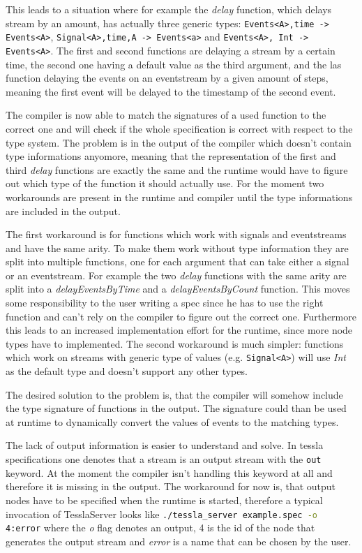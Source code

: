 This leads to a situation where for example the \emph{delay} function, which delays stream by an amount, has actually three generic types: \lstinline{Events<A>,time -> Events<A>}, \lstinline{Signal<A>,time,A -> Events<a>} and \lstinline{Events<A>, Int -> Events<A>}.
The first and second functions are delaying a stream by a certain time, the second one having a default value as the third argument, and the las function delaying the events on an eventstream by a given amount of steps, meaning the first event will be delayed to the timestamp of the second event.

The compiler is now able to match the signatures of a used function to the correct one and will check if the whole specification is correct with respect to the type system.
The problem is in the output of the compiler which doesn't contain type informations anyomore, meaning that the representation of the first and third \emph{delay} functions are exactly the same and the runtime would have to figure out which type of the function it should actually use.
For the moment two workarounds are present in the runtime and compiler until the type informations are included in the output.

The first workaround is for functions which work with signals and eventstreams and have the same arity.
To make them work without type information they are split into multiple functions, one for each argument that can take either a signal or an eventstream.
For example the two \emph{delay} functions with the same arity are split into a \emph{delayEventsByTime} and a \emph{delayEventsByCount} function.
This moves some responsibility to the user writing a spec since he has to use the right function and can't rely on the compiler to figure out the correct one.
Furthermore this leads to an increased implementation effort for the runtime, since more node types have to implemented.
The second workaround is much simpler: functions which work on streams with generic type of values (e.g. \lstinline{Signal<A>}) will use \emph{Int} as the default type and doesn't support any other types.

The desired solution to the problem is, that the compiler will somehow include the type signature of functions in the output.
The signature could than be used at runtime to dynamically convert the values of events to the matching types.

The lack of output information is easier to understand and solve.
In \gls{tessla} specifications one denotes that a stream is an output stream with the \lstinline{out} keyword.
At the moment the compiler isn't handling this keyword at all and therefore it is missing in the output.
The workaround for now is, that output nodes have to be specified when the runtime is started, therefore a typical invocation of TesslaServer looks like \lstinline[language=bash]{./tessla_server example.spec -o 4:error} where the \emph{o} flag denotes an output, 4 is the id of the node that generates the output stream and \emph{error} is a name that can be chosen by the user.


